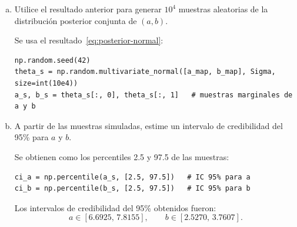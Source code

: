 \documentclass[a4paper]{article}
\begin{document}
\begin{enumerate}[a)]
\begin{lstlisting}
A = n/sigma**2 + 1/100
B = sum_x/sigma**2
C = sum_x2/sigma**2 + 1/100

Prec  = np.array([[A, B], [B, C]])  # matriz de precision 
Sigma = np.linalg.inv(Prec)         # covarianza posterior
\end{lstlisting}

La solución numérica obtenida para estas matrices fue:
\begin{equation}
  \Sigma^{-1}=
  \begin{bmatrix}
    188.8989 & 165.8626\\
    165.8626 & 155.9583
  \end{bmatrix}
  \label{eq:precision-numerica}
\end{equation}
\begin{equation}
  \Sigma=
  \begin{bmatrix}
    0.0800 & -0.0851\\
    -0.0851 & 0.0969
  \end{bmatrix}
  \label{eq:covarianza-numerica}
\end{equation}
Así, la posterior conjunta queda completamente determinada por la media MAP de~\eqref{eq:map-numerico} y la matriz de covarianza posterior de~\eqref{eq:covarianza-numerica}.

    
    \item Utilice el resultado anterior para generar $10^4$ muestras aleatorias de la distribución posterior conjunta de $(a, b).$
    
    Se usa el resultado~\eqref{eq:posterior-normal}:
\begin{lstlisting}
np.random.seed(42)
theta_s = np.random.multivariate_normal([a_map, b_map], Sigma, size=int(10e4))
a_s, b_s = theta_s[:, 0], theta_s[:, 1]   # muestras marginales de a y b
\end{lstlisting}

    
    \item A partir de las muestras simuladas, estime un intervalo de credibilidad del 95\% para $a$ y $b$.
    
    Se obtienen como los percentiles 2.5 y 97.5 de las muestras:
\begin{lstlisting}
ci_a = np.percentile(a_s, [2.5, 97.5])   # IC 95% para a
ci_b = np.percentile(b_s, [2.5, 97.5])   # IC 95% para b
\end{lstlisting}

Los intervalos de credibilidad del 95\% obtenidos fueron:
\begin{equation}
  a \in [6.6925,\,7.8155], \qquad
  b \in [2.5270,\,3.7607].
\end{equation}


\end{enumerate}
\end{document}
